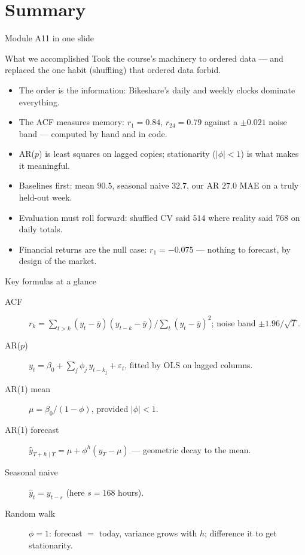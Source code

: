 \documentclass[aspectratio=169,11pt]{beamer}
\begin{document}
\section{Summary}

\begin{frame}{Module A11 in one slide}
  \begin{block}{What we accomplished}
    Took the course's machinery to ordered data --- and replaced the one habit
    (shuffling) that ordered data forbid.
  \end{block}
  \begin{itemize}
    \item The order is the information: Bikeshare's daily and weekly clocks
          dominate everything.
    \item The ACF measures memory: $r_1 = 0.84$, $r_{24} = 0.79$ against a
          $\pm 0.021$ noise band --- computed by hand and in code.
    \item AR($p$) is least squares on lagged copies; stationarity ($|\phi| < 1$)
          is what makes it meaningful.
    \item Baselines first: mean $90.5$, seasonal naive $32.7$, our AR $27.0$
          MAE on a truly held-out week.
    \item Evaluation must roll forward: shuffled CV said $514$ where reality said
          $768$ on daily totals.
    \item Financial returns are the null case: $r_1 = -0.075$ --- nothing to
          forecast, by design of the market.
  \end{itemize}
\end{frame}

\begin{frame}{Key formulas at a glance}
  \footnotesize
  \begin{description}
    \item[ACF] $r_k = \sum_{t>k} (y_t - \bar y)(y_{t-k} - \bar y) \big/
      \sum_t (y_t - \bar y)^2$; noise band $\pm 1.96/\sqrt{T}$.
    \item[AR($p$)] $y_t = \beta_0 + \sum_{j} \phi_j\, y_{t-k_j} + \varepsilon_t$,
      fitted by OLS on lagged columns.
    \item[AR(1) mean] $\mu = \beta_0 / (1 - \phi)$, provided $|\phi| < 1$.
    \item[AR(1) forecast] $\hat y_{T+h\mid T} = \mu + \phi^h (y_T - \mu)$ ---
      geometric decay to the mean.
    \item[Seasonal naive] $\hat y_t = y_{t-s}$ (here $s = 168$ hours).
    \item[Random walk] $\phi = 1$: forecast $=$ today, variance grows with $h$;
      difference it to get stationarity.
  \end{description}
\end{frame}
\end{document}
